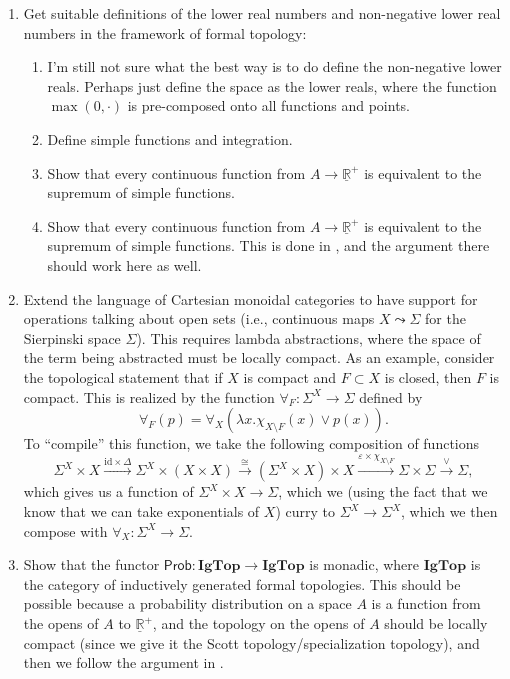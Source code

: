 \documentclass{article}           %
\begin{document}
\begin{enumerate}
\item Get suitable definitions of the lower real numbers and non-negative lower real numbers in the framework of formal topology:
\begin{enumerate}
  \item I'm still not sure what the best way is to do define the non-negative lower reals. Perhaps just define the space as the lower reals, where the function $\max(0, \cdot)$ is pre-composed onto all functions and points.
  \item Define simple functions and integration.
  \item Show that every continuous function from $A \to \underline{\mathbb{R}}^+$ is equivalent to the supremum of simple functions.
  \item Show that every continuous function from $A \to \underline{\mathbb{R}}^+$ is equivalent to the supremum of simple functions. This is done in \cite{jones1990}, and the argument there should work here as well.
\end{enumerate}

\item Extend the language of Cartesian monoidal categories to have support for operations talking about open sets (i.e., continuous maps $X \leadsto \Sigma$ for the Sierpinski space $\Sigma$). This requires lambda abstractions, where the space of the term being abstracted must be locally compact.
As an example, consider the topological statement that if $X$ is compact and $F \subset X$ is closed, then $F$ is compact\cite{escardo2004}. This is realized by the function $\forall_F : \Sigma^X \to \Sigma$ defined by
\[
\forall_F(p) = \forall_X(\lambda x. \chi_{X \setminus F}(x) \vee p(x)).
\]
To ``compile'' this function, we take the following composition of functions
\[
\Sigma^X \times X
\xrightarrow{\mathrm{id} \times \Delta}
\Sigma^X \times (X \times X)
\xrightarrow{\cong}
(\Sigma^X \times X) \times X
\xrightarrow{\varepsilon \times \chi_{X \setminus F}}
\Sigma \times \Sigma
\xrightarrow{\vee}
\Sigma,
\]
which gives us a function of $\Sigma^X \times X \to \Sigma$, which we (using the fact that we know that we can take exponentials of $X$) curry to $\Sigma^X \to \Sigma^X$, which we then compose with $\forall_X : \Sigma^X \to \Sigma$.

\item Show that the functor $\mathsf{Prob} : \mathbf{IgTop} \to \mathbf{IgTop}$ is monadic, where $\mathbf{IgTop}$ is the category of inductively generated formal topologies. This should be possible because a probability distribution on a space $A$ is a function from the opens of $A$ to $\underline{\mathbb{R}}^+$, and the topology on the opens of $A$ should be locally compact (since we give it the Scott topology/specialization topology), and then we follow the argument in \cite{maietti2005}.


\end{enumerate}
\end{document}

